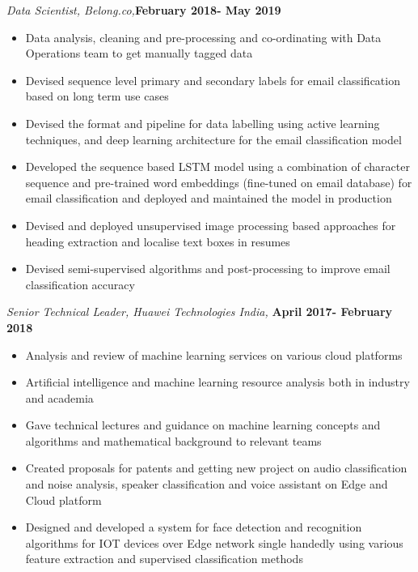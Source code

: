 \documentclass[line]{resume}
\begin{document}
{\begin{resume}
\begin{list2}
			\item \emph{Data Scientist, Belong.co,}\hfill \textbf{February 2018- May 2019}
			\begin{itemize}
				\item Data analysis, cleaning and pre-processing and co-ordinating with Data Operations team to get manually tagged data
				\item Devised sequence level primary and secondary labels for email classification  based on long term use cases
				\item Devised  the format and pipeline for data labelling using active learning techniques, and deep learning architecture for the email  classification model
				\item Developed the sequence based LSTM model using a combination of character  sequence and pre-trained word embeddings (fine-tuned on email database) for email classification and deployed and maintained the model in production
				\item Devised and deployed unsupervised image processing based approaches for heading extraction and localise text boxes in resumes
				\item Devised semi-supervised algorithms and post-processing  to improve email classification accuracy
			\end{itemize}
			\item \emph{Senior Technical Leader, Huawei Technologies India,} \hfill \textbf{April 2017- February 2018}
			
			\begin{itemize}
				\item Analysis and review of machine learning services on various cloud platforms \vspace{-.1cm}
				\item  Artificial intelligence and machine learning resource analysis both in industry and academia
				\item Gave technical lectures and guidance on machine learning  concepts and algorithms and  mathematical background to  relevant teams
				\item  Created proposals for patents and getting new project on audio classification and noise analysis, speaker classification and voice assistant on Edge and Cloud platform %
				\item Designed and developed a  system for face detection and recognition
				algorithms for IOT devices over Edge network single handedly using various feature extraction and supervised classification methods
				

\end{itemize}
\end{list2}
\end{resume}}
\end{document}
